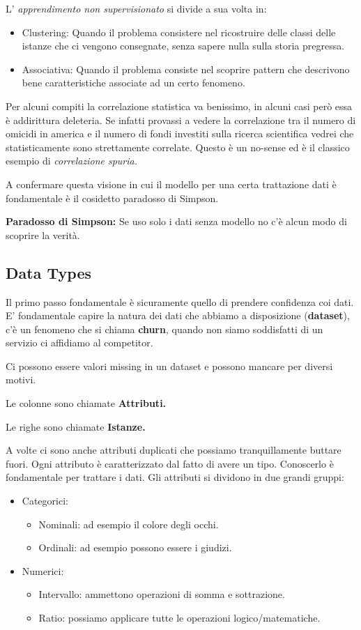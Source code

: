 L' \textit{apprendimento non supervisionato} si divide a sua volta in:
\begin{itemize}
	\item Clustering: Quando il problema consistere nel ricostruire delle classi delle istanze che ci vengono consegnate, senza sapere nulla sulla storia pregressa.
	\item Associativa: Quando il problema consiste nel scoprire pattern che descrivono bene caratteristiche associate ad un certo fenomeno.
\end{itemize}

Per alcuni compiti la correlazione statistica va benissimo, in alcuni casi però essa è addirittura deleteria.  Se infatti provassi a vedere la correlazione tra il numero di omicidi in america e il numero di fondi investiti sulla ricerca scientifica vedrei che statisticamente sono strettamente correlate. Questo è un no-sense ed è il classico esempio di \textit{correlazione spuria.}

A confermare questa visione in cui il modello per una certa trattazione dati è fondamentale è il cosidetto paradosso di Simpson.

\textbf{Paradosso di Simpson:} Se uso solo i dati senza modello no c'è alcun modo di scoprire la verità.


\subsection{Data Types}

Il primo passo fondamentale è sicuramente quello di prendere confidenza coi dati. E' fondamentale capire la natura dei dati che abbiamo a disposizione (\textbf{dataset}), c'è un fenomeno che si chiama \textbf{churn}, quando non siamo soddisfatti di un servizio ci affidiamo al competitor.

Ci possono essere valori missing in un dataset e possono mancare per diversi motivi.

Le colonne sono chiamate \textbf{Attributi.}

Le righe sono chiamate \textbf{Istanze.}

A volte ci sono anche attributi duplicati che possiamo tranquillamente buttare fuori.
Ogni attributo è caratterizzato dal fatto di avere un tipo. Conoscerlo è fondamentale per trattare i dati.
Gli attributi si dividono in due grandi gruppi:
\begin{itemize}
	\item Categorici:
	\begin{itemize}
		\item Nominali: ad esempio il colore degli occhi.
		\item Ordinali: ad esempio possono essere i giudizi.
	\end{itemize}
	\item Numerici:
	\begin{itemize}
		\item Intervallo: ammettono operazioni di somma e sottrazione. 
		\item Ratio: possiamo applicare tutte le operazioni logico/matematiche.
	\end{itemize}
\end{itemize}

